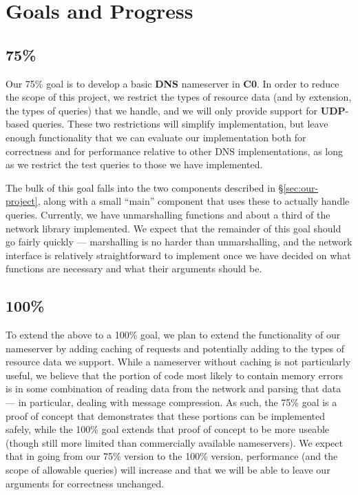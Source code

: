 \documentclass{article}
\newcommand\Kwd[1]{{\sffamily\bfseries{#1}}}
\begin{document}
\section{Goals and Progress}

\subsection{75\%}

Our 75\% goal is to develop a basic \Kwd{DNS} nameserver in \Kwd{C0}. In order to reduce the scope of this project, we restrict the types of resource data (and by extension, the types of queries) that we handle, and we will only provide support for \Kwd{UDP}-based queries. These two restrictions will simplify implementation, but leave enough functionality that we can evaluate our implementation both for correctness and for performance relative to other DNS implementations, as long as we restrict the test queries to those we have implemented.

The bulk of this goal falls into the two components described in \S\ref{sec:our-project}, along with a small ``main'' component that uses these to actually handle queries. Currently, we have unmarshalling functions and about a third of the network library implemented. We expect that the remainder of this goal should go fairly quickly --- marshalling is no harder than unmarshalling, and the network interface is relatively straightforward to implement once we have decided on what functions are necessary and what their arguments should be.

\subsection{100\%}

To extend the above to a 100\% goal, we plan to extend the functionality of our nameserver by adding caching of requests and potentially adding to the types of resource data we support. While a nameserver without caching is not particularly useful, we believe that the portion of code most likely to contain memory errors is in some combination of reading data from the network and parsing that data --- in particular, dealing with message compression. As such, the 75\% goal is a proof of concept that demonstrates that these portions can be implemented safely, while the 100\% goal extends that proof of concept to be more useable (though still more limited than commercially available nameservers). We expect that in going from our 75\% version to the 100\% version, performance (and the scope of allowable queries) will increase and that we will be able to leave our arguments for correctness unchanged.
\end{document}
